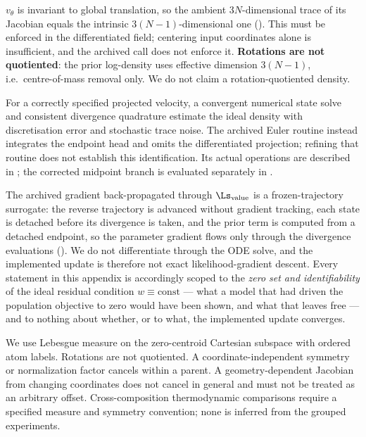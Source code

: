 \begin{assumption}
\label{ass:A3}
$v_\theta$ is invariant to global translation, so the ambient $3N$-dimensional
trace of its Jacobian equals the intrinsic $3(N-1)$-dimensional one
(). This must be enforced in the differentiated field; centering input coordinates alone is insufficient, and the archived call does not enforce it. \textbf{Rotations are not quotiented}: the prior log-density uses
effective dimension $3(N-1)$, i.e.\ centre-of-mass removal only. We do not claim a
rotation-quotiented density.
\end{assumption}

\begin{assumption}
\label{ass:A-disc}
For a correctly specified projected velocity, a convergent numerical state solve
and consistent divergence quadrature estimate the ideal density with discretisation
error and stochastic trace noise. The archived Euler routine instead integrates
the endpoint head and omits the differentiated projection; refining that routine
does not establish this identification. Its actual operations are described in
; the corrected midpoint branch is evaluated separately in
.
\end{assumption}

\begin{remark}
\label{rem:idealresidual}
The archived gradient back-propagated through $\Ls_{\mathrm{value}}$ is a
frozen-trajectory surrogate: the reverse trajectory is advanced without gradient
tracking, each state is detached before its divergence is taken, and the prior term
is computed from a detached endpoint, so the parameter gradient flows only through
the divergence evaluations (). We do not differentiate
through the ODE solve, and the implemented update is therefore not exact
likelihood-gradient descent. Every statement in this appendix is accordingly scoped
to the \emph{zero set and identifiability} of the ideal residual condition
$w \equiv \mathrm{const}$ --- what a model that had driven the population objective
to zero would have been shown, and what that leaves free --- and to nothing about
whether, or to what, the implemented update converges.
\end{remark}

\begin{assumption}
\label{ass:rigid}
We use Lebesgue measure on the zero-centroid Cartesian subspace with ordered
atom labels. Rotations are not quotiented. A coordinate-independent symmetry or
normalization factor cancels within a parent. A geometry-dependent Jacobian from
changing coordinates does not cancel in general and must not be treated as an
arbitrary offset. Cross-composition thermodynamic comparisons require a specified
measure and symmetry convention; none is inferred from the grouped experiments.
\end{assumption}

